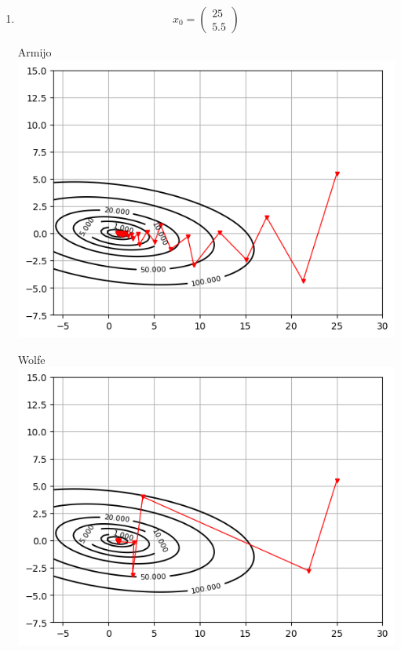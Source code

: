 \documentclass[12pt]{article}
\begin{document}
\begin{enumerate}

\item %

$$
x_0 = 
\begin{pmatrix}
25 \\
5.5
\end{pmatrix}
$$

Armijo
\includegraphics{exp1/x_0/1_armijo.png}


Wolfe
\includegraphics{exp1/x_0/1_wolfe.png}



\end{enumerate}
\end{document}

